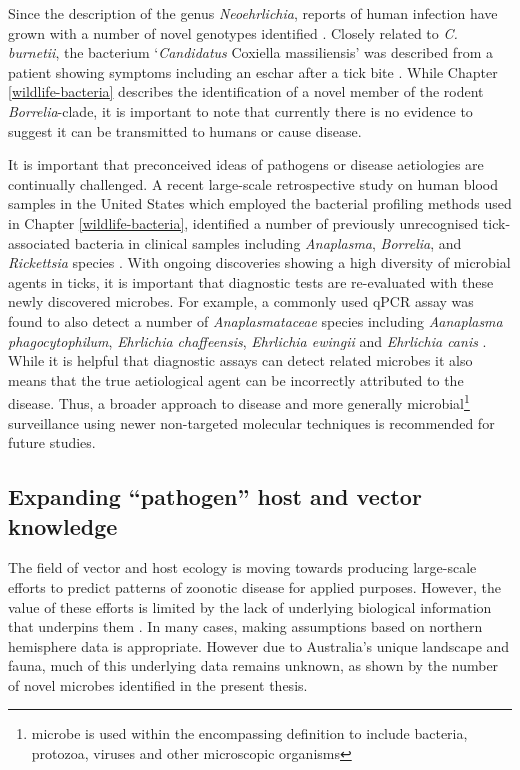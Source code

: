 \documentclass[a4paper, nobind]{templates/ociamthesis}
\begin{document}
Since the description of the genus \emph{Neoehrlichia}, reports of human infection have grown with a number of novel genotypes identified \autocite{wassCultivationCausativeAgent2019}.
Closely related to \emph{C. burnetii}, the bacterium `\emph{Candidatus} Coxiella massiliensis' was described from a patient showing symptoms including an eschar after a tick bite \autocite{angelakisCandidatusCoxiellaMassiliensis2016}.
While Chapter \ref{wildlife-bacteria} describes the identification of a novel member of the rodent \emph{Borrelia}-clade, it is important to note that currently there is no evidence to suggest it can be transmitted to humans or cause disease.

It is important that preconceived ideas of pathogens or disease aetiologies are continually challenged.
A recent large-scale retrospective study on human blood samples in the United States which employed the bacterial profiling methods used in Chapter \ref{wildlife-bacteria}, identified a number of previously unrecognised tick-associated bacteria in clinical samples including \emph{Anaplasma}, \emph{Borrelia}, and \emph{Rickettsia} species \autocite{kingryTargetedMetagenomicsClinical2020}.
With ongoing discoveries showing a high diversity of microbial agents in ticks, it is important that diagnostic tests are re-evaluated with these newly discovered microbes.
For example, a commonly used qPCR assay was found to also detect a number of \emph{Anaplasmataceae} species including \emph{Aanaplasma phagocytophilum}, \emph{Ehrlichia chaffeensis}, \emph{Ehrlichia ewingii} and \emph{Ehrlichia canis} \autocite{murphyPrevalenceDistributionHuman2017}.
While it is helpful that diagnostic assays can detect related microbes it also means that the true aetiological agent can be incorrectly attributed to the disease.
Thus, a broader approach to disease and more generally microbial\footnote{microbe is used within the encompassing definition to include bacteria, protozoa, viruses and other microscopic organisms} surveillance using newer non-targeted molecular techniques is recommended for future studies.

\hypertarget{expanding-pathogen-host-and-vector-knowledge}{%
\subsection{Expanding ``pathogen'' host and vector knowledge}\label{expanding-pathogen-host-and-vector-knowledge}}

The field of vector and host ecology is moving towards producing large-scale efforts to predict patterns of zoonotic disease for applied purposes.
However, the value of these efforts is limited by the lack of underlying biological information that underpins them \autocite{alberyFastlivedHostsZoonotic2020}.
In many cases, making assumptions based on northern hemisphere data is appropriate.
However due to Australia's unique landscape and fauna, much of this underlying data remains unknown, as shown by the number of novel microbes identified in the present thesis.
\end{document}
